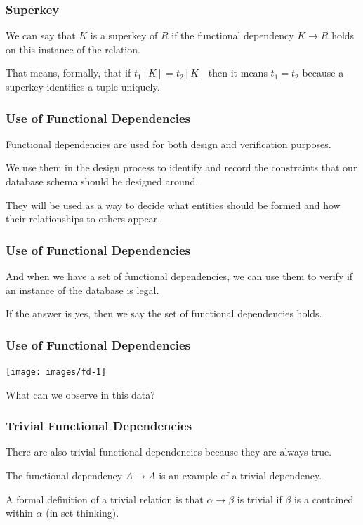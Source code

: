 \begin{frame}
\frametitle{Superkey}

We can say that $K$ is a superkey of $R$ if the functional dependency $K \rightarrow R$ holds on this instance of the relation. 

That means, formally, that if $t_{1}[K] = t_{2}[K]$ then it means $t_{1} = t_{2}$ because a superkey identifies a tuple uniquely.


\end{frame}



\begin{frame}
\frametitle{Use of Functional Dependencies}

Functional dependencies are used for both design and verification purposes. 

We use them in the design process to identify and record the constraints that our database schema should be designed around. 

They will be used as a way to decide what entities should be formed and how their relationships to others appear. 

\end{frame}



\begin{frame}
\frametitle{Use of Functional Dependencies}


And when we have a set of functional dependencies, we can use them to verify if an instance of the database is legal.

If the answer is yes, then we say the set of functional dependencies holds.

\end{frame}


\begin{frame}
\frametitle{Use of Functional Dependencies}

\begin{center}
\texttt{[image: images/fd-1]}
\end{center}

What can we observe in this data?

\end{frame}



\begin{frame}
\frametitle{Trivial Functional Dependencies}

There are also \alert{trivial} functional dependencies because they are always true.

The functional dependency $A \rightarrow A$ is an example of a trivial dependency. 

A formal definition of a trivial relation is that $\alpha \rightarrow \beta$ is trivial if $\beta$ is a contained within $\alpha$ (in set thinking).

\end{frame}


